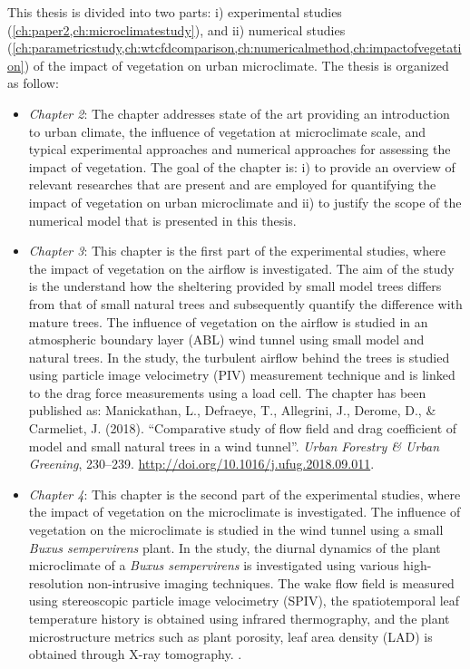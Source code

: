 This thesis is divided into two parts: i) experimental studies (\cref{ch:paper2,ch:microclimatestudy}), and ii) numerical studies (\cref{ch:parametricstudy,ch:wtcfdcomparison,ch:numericalmethod,ch:impactofvegetation}) of the impact of vegetation on urban microclimate. The thesis is organized as follow:
\begin{itemize}
	\item \textit{Chapter 2}: The chapter addresses state of the art providing an introduction to urban climate, the influence of vegetation at microclimate scale, and typical experimental approaches and numerical approaches for assessing the impact of vegetation. The goal of the chapter is: i) to provide an overview of relevant researches that are present and are employed for quantifying the impact of vegetation on urban microclimate and ii) to justify the scope of the numerical model that is presented in this thesis. 

	\item \textit{Chapter 3}: This chapter is the first part of the experimental studies, where the impact of vegetation on the airflow is investigated. The aim of the study is the understand how the sheltering provided by small model trees differs from that of small natural trees and subsequently quantify the difference with mature trees. The influence of vegetation on the airflow is studied in an atmospheric boundary layer (ABL) wind tunnel using small model and natural trees. In the study, the turbulent airflow behind the trees is studied using particle image velocimetry (PIV) measurement technique and is linked to the drag force measurements using a load cell. The chapter has been published as: Manickathan, L., Defraeye, T., Allegrini, J., Derome, D., \& Carmeliet, J. (2018). ``Comparative study of flow field and drag coefficient of model and small natural trees in a wind tunnel''. \textit{Urban Forestry \& Urban Greening}, 230–239. \url{http://doi.org/10.1016/j.ufug.2018.09.011}.	

	\item \textit{Chapter 4}: This chapter is the second part of the experimental studies, where the impact of vegetation on the microclimate is investigated. The influence of vegetation on the microclimate is studied in the wind tunnel using a small \textit{Buxus sempervirens} plant. In the study, the diurnal dynamics of the plant microclimate of a \textit{Buxus sempervirens} is investigated using various high-resolution non-intrusive imaging techniques. The wake flow field is measured using stereoscopic particle image velocimetry (SPIV), the spatiotemporal leaf temperature history is obtained using infrared thermography, and the plant microstructure metrics such as plant porosity, leaf area density (LAD) is obtained through X-ray tomography. .


\end{itemize}
